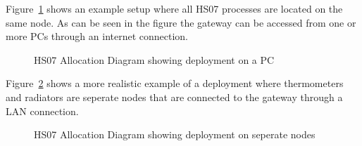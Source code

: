 \documentclass[a4paper,10pt]{article}
\begin{document}
Figure~\ref{fig:allocation_pc} shows an example setup
where all HS07 processes are located on the same node. As can be seen in the
figure the gateway can be accessed from one or more PCs through an internet
connection.

\clearpage

\begin{figure}[!htb]
\caption{HS07 Allocation Diagram showing deployment on a PC}
\label{fig:allocation_pc}
\end{figure}

Figure~\ref{fig:allocation_actual} shows a more realistic example of a deployment
where thermometers and radiators are seperate nodes that are connected to
the gateway through a LAN connection.

\begin{figure}[!htb]
\caption{HS07 Allocation Diagram showing deployment on seperate nodes}
\label{fig:allocation_actual}
\end{figure}

\end{document}
